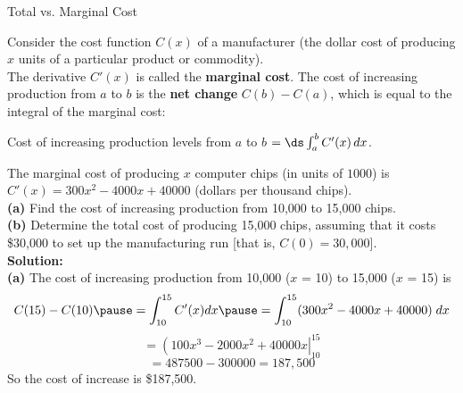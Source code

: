 \begin{frame}{Total vs. Marginal Cost}

Consider the cost function $C(x)$ of a manufacturer (the dollar cost of producing $ x $ units of a particular product or commodity).\\
The derivative $ C'(x) $ is called the \textbf{marginal cost}. The cost of increasing production from $ a $ to $ b $ is the \textbf{net change} $C(b) - C(a)$, which is equal to the integral of the marginal cost:\\

\begin{center}
Cost of increasing production levels from $a$ to $b$ $ = \ds \int_a^b C'(x)\,dx$.
\end{center}
\end{frame}

\begin{frame}
\begin{example}
The marginal cost of producing $x$ computer chips 
(in units of $1000$) is $C'(x) = 300x^2 - 4000x + 40000$ (dollars per thousand chips).\\
{\bf{(a)}} Find the cost of increasing production from 10,000 to 15,000 chips.\\

{\bf{(b)}} Determine the total cost of producing 15,000 chips, assuming that it costs \$30,000 to set up the manufacturing run 
[that is, $C(0) = 30,000$].\\
\textbf{Solution:}\\
\pause 
{\bf{(a)}} The cost of increasing production from 10,000 ($x$ = 10) to  15,000 ($x$ = 15) is
\[
C(15)-C(10) \pause =\int_{10}^{15} C'(x) dx \pause =\int_{10}^{15} (300x^2-4000x+40000)\;dx
\]
\[
= \left(100x^3-2000x^2+40000x\right|_{10}^{15}
\]
\[
=487500-300000=187,500
\]
So the cost of increase is \$187,500.
                 
\end{example}
\end{frame}

